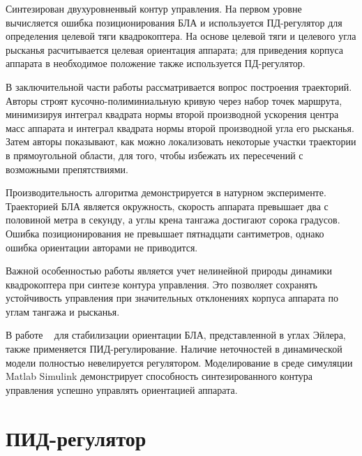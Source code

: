 \documentclass[a4paper,14pt,oneside,openany]{memoir}
\begin{document}
	Синтезирован двухуровненвый контур управления. На первом уровне вычисляется ошибка позиционирования БЛА и используется ПД-регулятор для определения целевой тяги квадрокоптера. На основе целевой тяги и целевого угла рысканья расчитывается целевая ориентация аппарата; для приведения корпуса аппарата в необходимое положение также используется ПД-регулятор.
	
	В заключительной части работы рассматривается вопрос построения траекторий. Авторы строят кусочно-полиминиальную кривую через набор точек маршрута, минимизируя интеграл квадрата нормы второй производной ускорения центра масс аппарата и интеграл квадрата нормы второй производной угла его рысканья. Затем  авторы показывают, как можно локализовать некоторые участки траектории в прямоугольной области, для того, чтобы избежать их пересечений с возможными препятствиями.
	
	Производительность алгоритма демонстрируется в натурном эксперименте. Траекторией БЛА является окружность, скорость аппарата превышает два с половиной метра в секунду, а углы крена тангажа достигают сорока градусов. Ошибка позиционирования не превышает пятнадцати сантиметров, однако ошибка ориентации авторами не приводится.
	
	Важной особенностью работы является учет нелинейной природы динамики квадрокоптера при синтезе контура управления. Это позволяет сохранять устойчивость управления при значительных отклонениях корпуса аппарата по углам тангажа и рысканья.
		
	В работе ~\cite{Praveen01} для стабилизации ориентации БЛА, представленной в углах Эйлера, также применяется ПИД-регулирование. Наличие неточностей в динамической модели полностью невелируется регулятором. Моделирование в среде симуляции Matlab Simulink демонстрирует способность синтезированного контура управления успешно управлять ориентацией аппарата.
	
	\section{ПИД-регулятор}
	
	
	{}
	
\end{document}
